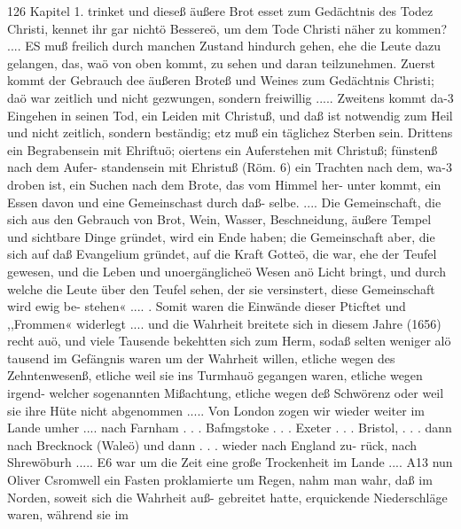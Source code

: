 126 Kapitel 1.
trinket und dieseß äußere Brot esset zum Gedächtnis des Todez
Christi, kennet ihr gar nichtö Bessereö, um dem Tode Christi näher
zu kommen? ....
ES muß freilich durch manchen Zustand hindurch gehen, ehe
die Leute dazu gelangen, das, waö von oben kommt, zu sehen
und daran teilzunehmen. Zuerst kommt der Gebrauch dee äußeren
Broteß und Weines zum Gedächtnis Christi; daö war zeitlich und
nicht gezwungen, sondern freiwillig ..... Zweitens kommt da-3
Eingehen in seinen Tod, ein Leiden mit Christuß, und daß ist
notwendig zum Heil und nicht zeitlich, sondern beständig; etz muß
ein täglichez Sterben sein. Drittens ein Begrabensein mit Ehriftuö;
oiertens ein Auferstehen mit Christuß; fünstenß nach dem Aufer-
standensein mit Ehristuß (Röm. 6) ein Trachten nach dem, wa-3
droben ist, ein Suchen nach dem Brote, das vom Himmel her-
unter kommt, ein Essen davon und eine Gemeinschast durch daß-
selbe. .... Die Gemeinschaft, die sich aus den Gebrauch von
Brot, Wein, Wasser, Beschneidung, äußere Tempel und sichtbare
Dinge gründet, wird ein Ende haben; die Gemeinschaft aber, die
sich auf daß Evangelium gründet, auf die Kraft Gotteö, die war,
ehe der Teufel gewesen, und die Leben und unoergänglicheö Wesen
anö Licht bringt, und durch welche die Leute über den Teufel
sehen, der sie versinstert, diese Gemeinschaft wird ewig be-
stehen« .... .
Somit waren die Einwände dieser Pticftet und ,,Frommen«
widerlegt .... und die Wahrheit breitete sich in diesem Jahre
(1656) recht auö, und viele Tausende bekehtten sich zum Herm,
sodaß selten weniger alö tausend im Gefängnis waren um der
Wahrheit willen, etliche wegen des Zehntenwesenß, etliche
weil sie ins Turmhauö gegangen waren, etliche wegen irgend-
welcher sogenannten Mißachtung, etliche wegen deß Schwörenz
oder weil sie ihre Hüte nicht abgenommen .....
Von London zogen wir wieder weiter im Lande umher ....
nach Farnham . . . Bafmgstoke . . . Exeter . . . Bristol, . . . dann
nach Brecknock (Waleö) und dann . . . wieder nach England zu-
rück, nach Shrewöburh .....
E6 war um die Zeit eine große Trockenheit im Lande ....
A13 nun Oliver Csromwell ein Fasten proklamierte um Regen,
nahm man wahr, daß im Norden, soweit sich die Wahrheit auß-
gebreitet hatte, erquickende Niederschläge waren, während sie im


